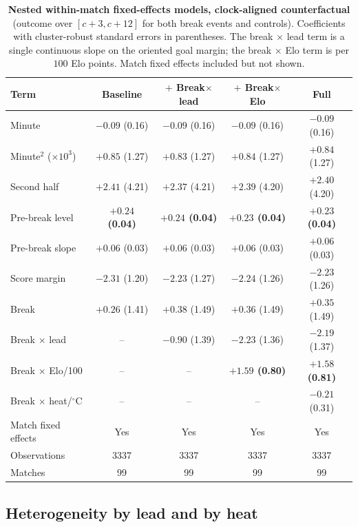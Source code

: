 \documentclass[11pt]{article}
\begin{document}
\begin{table}[t]
\centering\small
\caption{\textbf{Nested within-match fixed-effects models, clock-aligned counterfactual} (outcome over
$[c{+}3,c{+}12]$ for both break events and controls). Coefficients with cluster-robust standard errors in
parentheses. The break $\times$ lead term is a single continuous slope on the oriented goal margin; the break
$\times$ Elo term is per $100$ Elo points. Match fixed effects included but not shown.}
\label{tab:ladder}
\begin{tabular}{lcccc}
\toprule
Term & Baseline & $+$ Break$\times$lead & $+$ Break$\times$Elo & Full \\
\midrule
Minute & $-0.09$ (0.16) & $-0.09$ (0.16) & $-0.09$ (0.16) & $-0.09$ (0.16) \\
Minute$^2$ ($\times10^{3}$) & $+0.85$ (1.27) & $+0.83$ (1.27) & $+0.84$ (1.27) & $+0.84$ (1.27) \\
Second half & $+2.41$ (4.21) & $+2.37$ (4.21) & $+2.39$ (4.20) & $+2.40$ (4.20) \\
Pre-break level & {\boldmath\bfseries $+0.24$ (0.04)} & {\boldmath\bfseries $+0.24$ (0.04)} & {\boldmath\bfseries $+0.23$ (0.04)} & {\boldmath\bfseries $+0.23$ (0.04)} \\
Pre-break slope & $+0.06$ (0.03) & $+0.06$ (0.03) & $+0.06$ (0.03) & $+0.06$ (0.03) \\
Score margin & $-2.31$ (1.20) & $-2.23$ (1.27) & $-2.24$ (1.26) & $-2.23$ (1.26) \\
Break & $+0.26$ (1.41) & $+0.38$ (1.49) & $+0.36$ (1.49) & $+0.35$ (1.49) \\
Break $\times$ lead & -- & $-0.90$ (1.39) & $-2.23$ (1.36) & $-2.19$ (1.37) \\
Break $\times$ Elo/100 & -- & -- & {\boldmath\bfseries $+1.59$ (0.80)} & {\boldmath\bfseries $+1.58$ (0.81)} \\
Break $\times$ heat/$^\circ$C & -- & -- & -- & $-0.21$ (0.31) \\
\midrule
Match fixed effects & Yes & Yes & Yes & Yes \\
Observations & 3337 & 3337 & 3337 & 3337 \\
Matches & 99 & 99 & 99 & 99 \\
\bottomrule
\end{tabular}
\end{table}

\subsection{Heterogeneity by lead and by heat}
\label{sec:within-cate}
\end{document}

